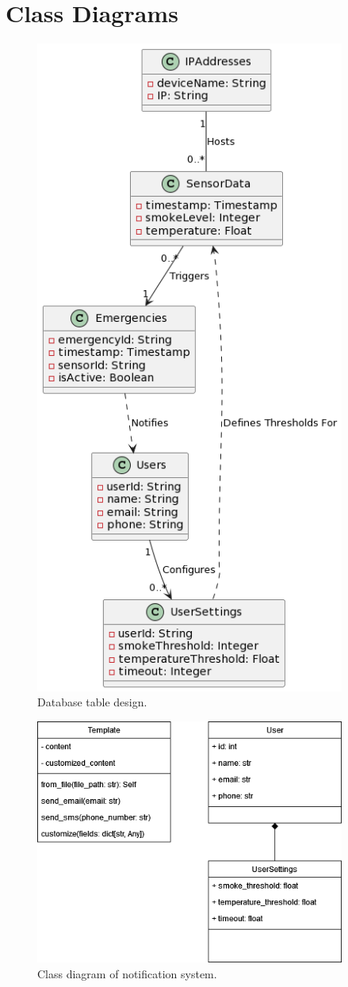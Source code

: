 \section{Class Diagrams}

\begin{figure}[H]
    \centering
    \includegraphics[width=4in]{../assets/class/DatabaseTableDesign.png}
    \caption{Database table design.}
\end{figure}

\begin{figure}[H]
    \centering
    \includegraphics[width=4in]{../assets/class/NotificationSystemClassDiagram.png}
    \caption{Class diagram of notification system.}
\end{figure}
